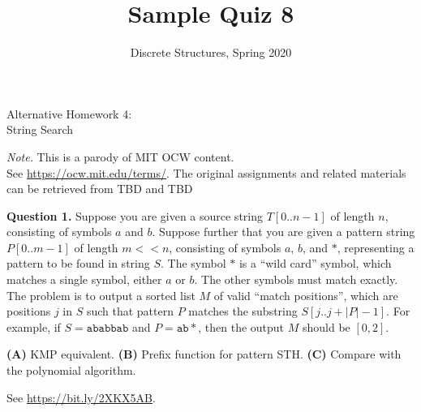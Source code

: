 \documentclass[jou]{apa6}
\title{Sample Quiz 8}
\author{Discrete Structures, Spring 2020}
\affiliation{RBS}
\begin{document}
\twocolumn
\thispagestyle{empty}

\begin{center}
{\Large Alternative Homework 4:}\\
{\Large String Search}
\end{center}


\begin{changemargin}{10pt}{10pt}
{\footnotesize
{\em Note.} This is a parody of MIT OCW content.\\
See \url{https://ocw.mit.edu/terms/}. 
The original assignments and related materials can be retrieved from 
TBD and TBD\\
}
\end{changemargin}




{\bf Question 1.}
Suppose you are given a source string $T[0..n-1]$ of length $n$, consisting of symbols $a$ and $b$.
Suppose further that you are given a pattern string $P[0..m-1]$ of length $m<<n$, consisting of
symbols $a$, $b$, and $\ast$, representing a pattern to be found in string $S$. The symbol $\ast$ is a ``wild card''
symbol, which matches a single symbol, either $a$ or $b$. The other symbols must match exactly.
The problem is to output a sorted list $M$ of valid ``match positions'', which are positions $j$ in $S$
such that pattern $P$ matches the substring $S[j..j+|P|-1]$. For example, if $S =\mathtt{ababbab}$ and
$P=\mathtt{ab\ast}$, then the output $M$ should be $[0,2]$.

{\bf (A)} KMP equivalent. 
{\bf (B)} Prefix function for pattern STH.
{\bf (C)} Compare with the polynomial algorithm. 




See \url{https://bit.ly/2XKX5AB}. 








\end{document}
